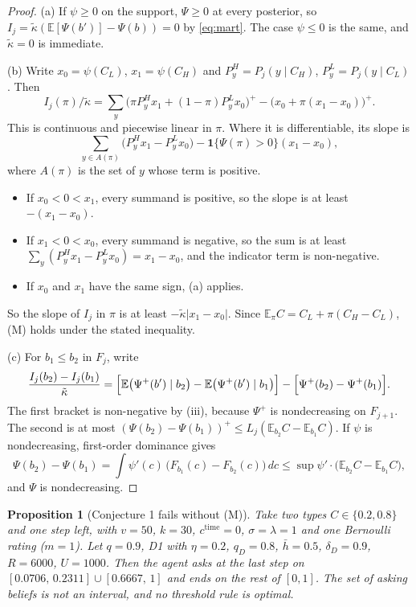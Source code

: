 \documentclass[11pt,a4paper]{article}
\newtheorem{proposition}[theorem]{Proposition}
\theoremstyle{definition}
\theoremstyle{remark}
\newcommand{\E}{\mathbb{E}}
\newcommand{\kt}{\tilde\kappa}
\begin{document}
\begin{proof}
(a) If $\psi\ge0$ on the support, $\Psi\ge0$ at every posterior, so $I_j=\kt(\E[\Psi(b')]-\Psi(b))=0$ by \eqref{eq:mart}. The case $\psi\le0$ is the same, and $\kt=0$ is immediate.

(b) Write $x_0=\psi(C_L)$, $x_1=\psi(C_H)$ and $P^H_y=P_j(y\mid C_H)$, $P^L_y=P_j(y\mid C_L)$. Then
\[
I_j(\pi)/\kt=\sum_y\bigl(\pi P_y^Hx_1+(1-\pi)P_y^Lx_0\bigr)^+-\bigl(x_0+\pi(x_1-x_0)\bigr)^+ .
\]
This is continuous and piecewise linear in $\pi$. Where it is differentiable, its slope is
\[
\sum_{y\in A(\pi)}\bigl(P_y^Hx_1-P_y^Lx_0\bigr)-\mathbf 1\{\Psi(\pi)>0\}(x_1-x_0),
\]
where $A(\pi)$ is the set of $y$ whose term is positive.
\begin{itemize}[nosep]
\item If $x_0<0<x_1$, every summand is positive, so the slope is at least $-(x_1-x_0)$.
\item If $x_1<0<x_0$, every summand is negative, so the sum is at least $\sum_y(P_y^Hx_1-P_y^Lx_0)=x_1-x_0$, and the indicator term is non-negative.
\item If $x_0$ and $x_1$ have the same sign, (a) applies.
\end{itemize}
So the slope of $I_j$ in $\pi$ is at least $-\kt|x_1-x_0|$. Since $\E_\pi C=C_L+\pi(C_H-C_L)$, (M) holds under the stated inequality.

(c) For $b_1\le b_2$ in $F_j$, write
\[
\frac{I_j(b_2)-I_j(b_1)}{\kt}=\Bigl[\E\bigl(\Psi^+(b')\mid b_2\bigr)-\E\bigl(\Psi^+(b')\mid b_1\bigr)\Bigr]-\Bigl[\Psi^+(b_2)-\Psi^+(b_1)\Bigr].
\]
The first bracket is non-negative by (iii), because $\Psi^+$ is nondecreasing on $F_{j+1}$. The second is at most $(\Psi(b_2)-\Psi(b_1))^+\le L_j(\E_{b_2}C-\E_{b_1}C)$. If $\psi$ is nondecreasing, first-order dominance gives
\[
\Psi(b_2)-\Psi(b_1)=\int\psi'(c)\,\bigl(F_{b_1}(c)-F_{b_2}(c)\bigr)\,dc\le\sup\psi'\cdot\bigl(\E_{b_2}C-\E_{b_1}C\bigr),
\]
and $\Psi$ is nondecreasing.
\end{proof}

\begin{proposition}[Conjecture 1 fails without (M)]\label{prop:c1-counter}
Take two types $C\in\{0.2,0.8\}$ and one step left, with $v=50$, $k=30$, $c^{\mathrm{time}}=0$, $\sigma=\lambda=1$ and one Bernoulli rating ($m=1$). Let $q=0.9$, D1 with $\eta=0.2$, $q_D=0.8$, $\bar h=0.5$, $\delta_D=0.9$, $R=6000$, $U=1000$. Then the agent asks at the last step on $[0.0706,\,0.2311]\cup[0.6667,\,1]$ and ends on the rest of $[0,1]$. The set of asking beliefs is not an interval, and no threshold rule is optimal.
\end{proposition}
\end{document}
